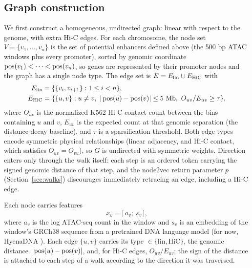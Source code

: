 \subsection{Graph construction}
We first construct a homogeneous, undirected graph: linear with respect to the genome, with extra Hi-C edges. For each chromosome, the node set $V=\{v_1,\ldots,v_n\}$ is the set of potential enhancers defined above (the 500 bp ATAC windows plus every promoter), sorted by genomic coordinate $\operatorname{pos}(v_1)<\cdots<\operatorname{pos}(v_n)$, so genes are represented by their promoter nodes and the graph has a single node type. The edge set is $E=E_{\mathrm{lin}}\cup E_{\mathrm{HiC}}$ with
\begin{align}
  \Elin &= \{\{v_i,v_{i+1}\} : 1\le i<n\},\\
  \Ehic &= \{\{u,v\} : u\ne v,\ |\pos(u)-\pos(v)|\le 5\ \mathrm{Mb},\ O_{uv}/E_{uv}\ge\tau\},
\end{align}
where $O_{uv}$ is the normalized K562 Hi-C contact count between the bins containing $u$ and $v$, $E_{uv}$ is the expected count at that genomic separation (the distance-decay baseline), and $\tau$ is a sparsification threshold. Both edge types encode symmetric physical relationships (linear adjacency, and Hi-C contact, which satisfies $O_{uv}=O_{vu}$), so $G$ is undirected with symmetric weights. Direction enters only through the walk itself: each step is an ordered token carrying the signed genomic distance of that step, and the node2vec return parameter $p$ (Section~\ref{sec:walks}) discourages immediately retracing an edge, including a Hi-C edge.

Each node carries features
\begin{equation}
  x_v=\big[\,a_v;\ s_v\,\big],
\end{equation}
where $a_v$ is the log ATAC-seq count in the window and $s_v$ is an embedding of the window's GRCh38 sequence from a pretrained DNA language model (for now, HyenaDNA \cite{nguyen2023hyenadna}). Each edge $\{u,v\}$ carries its type $\in\{\mathrm{lin},\mathrm{HiC}\}$, the genomic distance $|\operatorname{pos}(u)-\operatorname{pos}(v)|$, and, for Hi-C edges, $O_{uv}/E_{uv}$; the sign of the distance is attached to each step of a walk according to the direction it was traversed.

